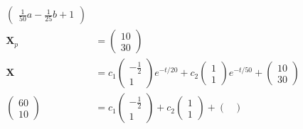\documentclass{article}
\begin{document}
\begin{enumerate}
\begin{align*}
\begin{pmatrix}
                                \frac{1}{50} a - \frac{1}{25} b + 1
                              \end{pmatrix}                                                                 \\
          \mathbf{X}_p    & = \begin{pmatrix}
                                10 \\
                                30
                              \end{pmatrix}                                                                                     \\
          \mathbf{X}      & = c_1 \begin{pmatrix}
                                    -\frac{1}{2} \\
                                    1
                                  \end{pmatrix} e^{-t / 20} + c_2 \begin{pmatrix}
                                                                    1 \\
                                                                    1
                                                                  \end{pmatrix} e^{-t / 50} + \begin{pmatrix}
                                                                                                10 \\
                                                                                                30
                                                                                              \end{pmatrix}                     \\
          \begin{pmatrix}
            60 \\
            10
          \end{pmatrix} & = c_1 \begin{pmatrix}
                                  -\frac{1}{2} \\
                                  1
                                \end{pmatrix} + c_2 \begin{pmatrix}
                                                      1 \\
                                                      1
                                                    \end{pmatrix} + \begin{pmatrix}

\end{pmatrix}
\end{align*}
\end{enumerate}
\end{document}
